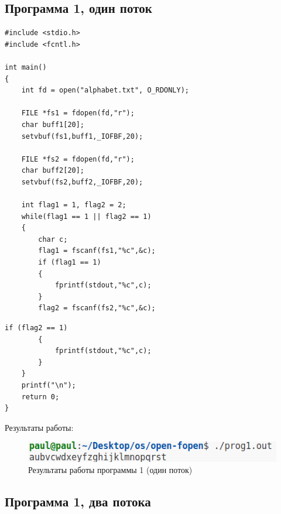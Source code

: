 \subsection*{Программа 1, один поток}

\begin{center}
	\captionsetup{justification=raggedright,singlelinecheck=off}

	\begin{lstlisting}[label=lst:prog1-1,caption=Программа 1 --- один поток--- часть 1]
#include <stdio.h>
#include <fcntl.h>

int main()
{
    int fd = open("alphabet.txt", O_RDONLY);

    FILE *fs1 = fdopen(fd,"r");
    char buff1[20];
    setvbuf(fs1,buff1,_IOFBF,20);

    FILE *fs2 = fdopen(fd,"r");
    char buff2[20];
    setvbuf(fs2,buff2,_IOFBF,20);
    
    int flag1 = 1, flag2 = 2;
    while(flag1 == 1 || flag2 == 1)
    {
        char c;
        flag1 = fscanf(fs1,"%c",&c);
        if (flag1 == 1) 
        {
            fprintf(stdout,"%c",c);
        }
        flag2 = fscanf(fs2,"%c",&c);
	\end{lstlisting}
\end{center}

\clearpage

\begin{center}
	\captionsetup{justification=raggedright,singlelinecheck=off}

	\begin{lstlisting}[label=lst:prog1-2,caption=Программа 1 --- один поток --- часть 2]
         if (flag2 == 1) 
        { 
            fprintf(stdout,"%c",c); 
        }
    }
    printf("\n");
    return 0;
}
	\end{lstlisting}
\end{center}

Результаты работы:

\begin{figure}[h]
	\centering
	\captionsetup{justification=centering}
	\includegraphics[width=150mm]{img/prog1.png}
	\caption{Результаты работы программы 1 (один поток)}
	\label{fig:prog-1-result}
\end{figure}

\subsection*{Программа 1, два потока}


